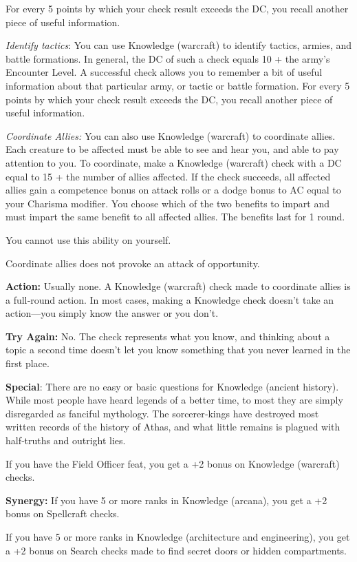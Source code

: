 For every 5 points by which your check result exceeds the DC, you recall another piece of useful information.

\textit{Identify tactics}: You can use Knowledge (warcraft) to identify tactics, armies, and battle formations. In general, the DC of such a check equals 10 + the army's Encounter Level. A successful check allows you to remember a bit of useful information about that particular army, or tactic or battle formation. For every 5 points by which your check result exceeds the DC, you recall another piece of useful information.

\textit{Coordinate Allies:} You can also use Knowledge (warcraft) to coordinate allies. Each creature to be affected must be able to see and hear you, and able to pay attention to you. To coordinate, make a Knowledge (warcraft) check with a DC equal to 15 + the number of allies affected. If the check succeeds, all affected allies gain a competence bonus on attack rolls or a dodge bonus to AC equal to your Charisma modifier. You choose which
of the two benefits to impart and must impart the same benefit to all affected allies. The benefits last for 1 round.

You cannot use this ability on yourself.

Coordinate allies does not provoke an attack of opportunity.

\textbf{Action:} Usually none. A Knowledge (warcraft) check made to coordinate allies is a full‐round action. In most cases, making a Knowledge check doesn't take an action---you simply know the answer or you don't.

\textbf{Try Again:} No. The check represents what you know, and thinking about a topic a second time doesn't let you know something that you never learned in the first place.

\textbf{Special}: There are no easy or basic questions for Knowledge (ancient history). While most people have heard legends of a better time, to most they are simply disregarded as fanciful mythology. The sorcerer‐kings have destroyed most written records of the history of Athas, and what little remains is plagued with half‐truths and outright lies.

If you have the Field Officer feat, you get a +2 bonus on Knowledge (warcraft) checks.

\textbf{Synergy:} If you have 5 or more ranks in Knowledge (arcana), you get a +2 bonus on Spellcraft checks.

If you have 5 or more ranks in Knowledge (architecture and engineering), you get a +2 bonus on Search checks made to find secret doors or hidden compartments.

